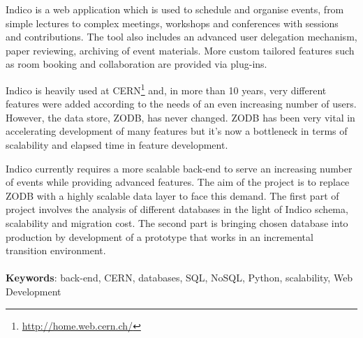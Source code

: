 \begin{abstracts}

\par Indico is a web application which is used to schedule and organise events, from simple lectures to complex meetings, workshops and conferences with sessions and contributions. The tool also includes an advanced user delegation mechanism, paper reviewing, archiving of event materials. More custom tailored features such as room booking and collaboration are provided via plug-ins.
\\
\par Indico is heavily used at \textsc{CERN}\footnote{\url{http://home.web.cern.ch/}} and, in more than 10 years, very different features were added according to the needs of an even increasing number of users. However, the data store, \textsc{ZODB}, has never changed. \textsc{ZODB} has been very vital in accelerating development of many features but it's now a bottleneck in terms of scalability and elapsed time in feature development.
\\
\par Indico currently requires a more scalable back-end to serve an increasing number of events while providing advanced features. The aim of the project is to replace \textsc{ZODB} with a highly scalable data layer to face this demand. The first part of project involves the analysis of different databases in the light of Indico schema, scalability and migration cost. The second part is bringing chosen database into production by development of a prototype that works in an incremental transition environment.
\\
\\
\textbf{Keywords}: back-end, CERN, databases, SQL, NoSQL, Python, scalability, Web Development

\end{abstracts}
